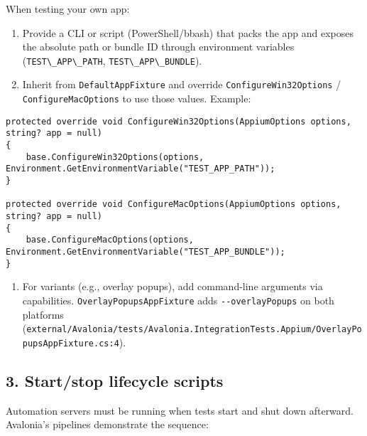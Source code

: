 When testing your own app:

\begin{enumerate}
\def\labelenumi{\arabic{enumi}.}
\tightlist
\item
  Provide a CLI or script (PowerShell/bbash) that packs the app and
  exposes the absolute path or bundle ID through environment variables
  (\passthrough{\lstinline!TEST\_APP\_PATH!},
  \passthrough{\lstinline!TEST\_APP\_BUNDLE!}).
\item
  Inherit from \passthrough{\lstinline!DefaultAppFixture!} and override
  \passthrough{\lstinline!ConfigureWin32Options!} /
  \passthrough{\lstinline!ConfigureMacOptions!} to use those values.
  Example:
\end{enumerate}

\begin{lstlisting}
protected override void ConfigureWin32Options(AppiumOptions options, string? app = null)
{
    base.ConfigureWin32Options(options, Environment.GetEnvironmentVariable("TEST_APP_PATH"));
}

protected override void ConfigureMacOptions(AppiumOptions options, string? app = null)
{
    base.ConfigureMacOptions(options, Environment.GetEnvironmentVariable("TEST_APP_BUNDLE"));
}
\end{lstlisting}

\begin{enumerate}
\def\labelenumi{\arabic{enumi}.}
\setcounter{enumi}{2}
\tightlist
\item
  For variants (e.g., overlay popups), add command-line arguments via
  capabilities. \passthrough{\lstinline!OverlayPopupsAppFixture!} adds
  \passthrough{\lstinline!--overlayPopups!} on both platforms
  (\passthrough{\lstinline!external/Avalonia/tests/Avalonia.IntegrationTests.Appium/OverlayPopupsAppFixture.cs:4!}).
\end{enumerate}

\subsection{3. Start/stop lifecycle
scripts}\label{startstop-lifecycle-scripts}

Automation servers must be running when tests start and shut down
afterward. Avalonia's pipelines demonstrate the sequence:

